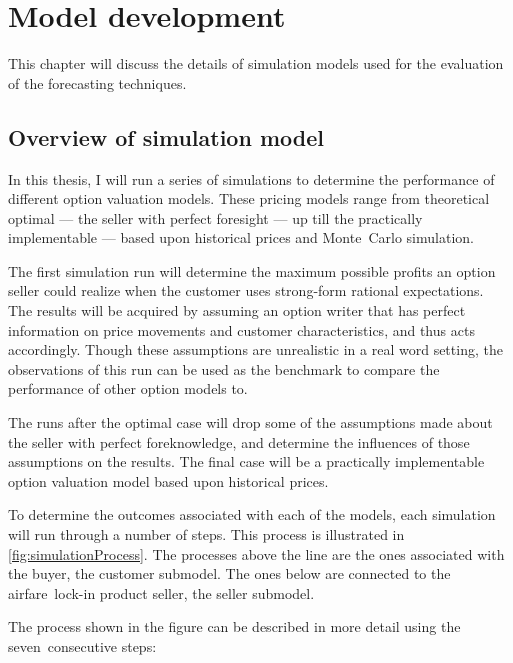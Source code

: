 \chapter{Model development}
\label{chap:ModelDevelopment}
This chapter will discuss the details of simulation models used for the evaluation of the forecasting techniques.

\section{Overview of simulation model}
\label{sec:SimulationModel}
In this thesis, I will run a series of simulations to determine the performance of different option valuation models. These pricing models range from theoretical optimal --- the seller with perfect foresight --- up till the practically implementable --- based upon historical prices and Monte~Carlo simulation.

The first simulation run will determine the maximum possible profits an option seller could realize when the customer uses strong-form rational expectations. The results will be acquired by assuming an option writer that has perfect information on price movements and customer characteristics, and thus acts accordingly. Though these assumptions are unrealistic in a real word setting, the observations of this run can be used as the benchmark to compare the performance of other option models to.

The runs after the optimal case will drop some of the assumptions made about the seller with perfect foreknowledge, and determine the influences of those assumptions on the results. The final case will be a practically implementable option valuation model based upon historical prices.

To determine the outcomes associated with each of the models, each simulation will run through a number of steps. This process is illustrated in \autoref{fig:simulationProcess}. The processes above the line are the ones associated with the buyer, the customer submodel. The ones below are connected to the airfare~lock-in product seller, the seller submodel.


The process shown in the figure can be described in more detail using the seven~consecutive steps:

